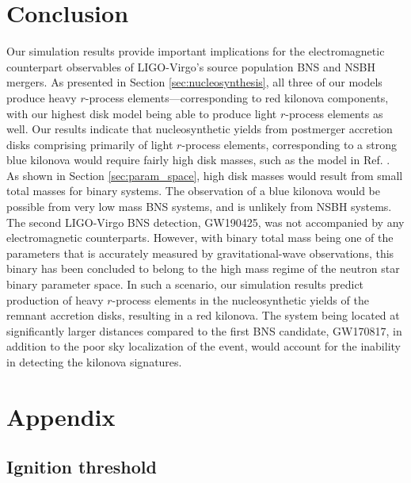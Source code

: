 \section{Conclusion}
\label{sec:conclusion}


Our simulation results provide important implications for the electromagnetic counterpart observables of LIGO-Virgo's source population BNS and NSBH mergers. As presented in Section \ref{sec:nucleosynthesis}, all three of our models produce heavy $r$-process elements---corresponding to red kilonova components, with our highest disk model being able to produce light $r$-process elements as well. Our results indicate that nucleosynthetic yields from postmerger accretion disks comprising primarily of light $r$-process elements, corresponding to a strong blue kilonova would require fairly high disk masses, such as the model in Ref. \cite{miller_full_2019-1}. As shown in Section \ref{sec:param_space}, high disk masses would result from small total masses for binary systems. The observation of a blue kilonova would be possible from very low mass BNS systems, and is unlikely from NSBH systems. The second LIGO-Virgo BNS detection, GW190425, was not accompanied by any electromagnetic counterparts. However, with binary total mass being one of the parameters that is accurately measured by gravitational-wave observations, this binary has been concluded to belong to the high mass regime of the neutron star binary parameter space. In such a scenario, our simulation results predict production of heavy $r$-process elements in the nucleosynthetic yields of the remnant accretion disks, resulting in a red kilonova. The system being located at significantly larger distances compared to the first BNS candidate, GW170817, in addition to the poor sky localization of the event, would account for the inability in detecting the kilonova signatures. 

\section{Appendix}
\subsection{Ignition threshold}
\label{app:ignition_threshold}

